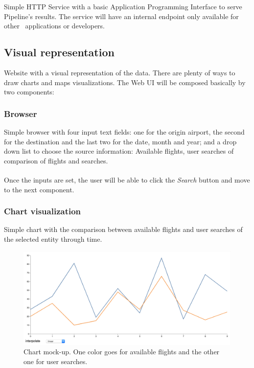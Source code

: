 Simple HTTP Service with a basic Application Programming Interface to serve Pipeline's results. The service will have an internal endpoint only available for other \company\ applications or developers.

\subsection{Visual representation} \label{visual_representation}

Website with a visual representation of the data. There are plenty of ways to draw charts and maps visualizations. The Web UI will be composed basically by two components:

\subsubsection*{Browser} \label{browser}

Simple browser with four input text fields: one for the origin airport, the second for the destination and the last two for the date, month and year; and a drop down list to choose the source information: Available flights, user searches of comparison of flights and searches.
\\\\
Once the inputs are set, the user will be able to click the \textit{Search} button and move to the next component.

\subsubsection*{Chart visualization} \label{chart_visualization}

Simple chart with the comparison between available flights and user searches of the selected entity through time.

\begin{figure}[H]
\centering
\includegraphics[scale=0.4]{resources/lineal-chart-example01.png}
\caption{Chart mock-up. One color goes for available flights and the other one for user searches.}
\end{figure}

